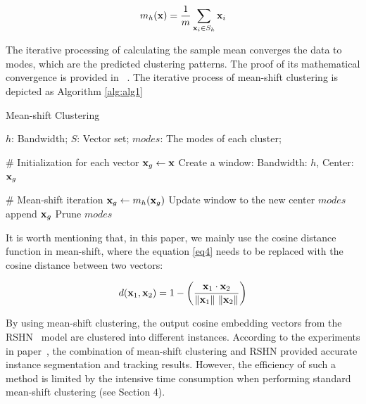 \documentclass[journal,twoside,web]{ieeecolor}
\begin{document}
\begin{equation}
{m_h}({\bf{x}}) = \frac{1}{m}\sum\limits_{{{\bf{x}}_i} \in {S_h}} {{{\bf{x}}_i}} 
\label{eq8}\end{equation}

The iterative processing of calculating the sample mean converges the data to modes, which are the predicted clustering patterns. The proof of its mathematical convergence is provided in ~\cite{b21,b31}. The iterative process of mean-shift clustering is depicted as Algorithm \ref{alg:alg1}

\begin{algorithm}[h]  
  \caption{Mean-shift Clustering}  
  \label{alg:alg1}  
  \begin{algorithmic}[1] 
    \Require 
      $h$: Bandwidth;  
      $S$: Vector set;  
    \Ensure  
      $modes$: The modes of each cluster;   
    
    \State \# Initialization for each vector
    \State ${{\bf{x}}_g} \gets {\bf{x}}$
    \State Create a window: Bandwidth: $h$, Center: ${{\bf{x}}_g}$
    
    \State \# Mean-shift iteration
            \State ${{\bf{x}}_g} \gets {m_h}({{\bf{x}}_g})$
            \State Update window to the new center
        \EndWhile
        \State $modes$ append ${{\bf{x}}_g}$
    \EndFor
    \State Prune $modes$
  \end{algorithmic}  
\end{algorithm} 

It is worth mentioning that, in this paper, we mainly use the cosine distance function in mean-shift, where the equation \eqref{eq4} needs to be replaced with the cosine distance between two vectors:

\begin{equation}
d({{\bf{x}}_1},{{\bf{x}}_2}) = 1 - \left( {\frac{{{{\bf{x}}_1} \cdot {{\bf{x}}_2}}}{{\left\| {{{\bf{x}}_1}} \right\|{\rm{ }}\left\| {{{\bf{x}}_2}} \right\|}}} \right)
\label{eq9}\end{equation}

By using mean-shift clustering, the output cosine embedding vectors from the RSHN~\cite{b15} model are clustered into different instances. According to the experiments in paper~\cite{b15}, the combination of mean-shift clustering and RSHN provided accurate instance segmentation and tracking results. However, the efficiency of such a method is limited by the intensive time consumption when performing standard mean-shift clustering (see Section 4). 
\end{document}
